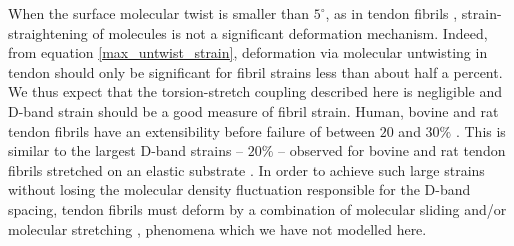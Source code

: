 When the surface molecular twist is smaller than $5^\circ$, as in tendon fibrils \cite{Hulmes:1981}, strain-straightening of molecules is not a significant deformation mechanism. Indeed, from equation \ref{max_untwist_strain}, deformation via molecular untwisting in tendon should only be significant for fibril strains less than about half a percent. We thus expect that the torsion-stretch coupling described here is negligible and D-band strain should be a good measure of fibril strain. Human, bovine and rat tendon fibrils have an extensibility before failure of between $20$ and $30\%$ \cite{Quigley:2018, Svensson:2013}. This is similar to the largest D-band strains  -- $20\%$ -- observed for bovine and rat tendon fibrils stretched on an elastic substrate \cite{Gachon:2020, Peacock:2019}. In order to achieve such large strains without losing the molecular density fluctuation responsible for the D-band spacing, tendon fibrils must deform by a combination of molecular sliding \cite{Gautieri:2017, Peacock:2019} and/or molecular stretching \cite{Iqbal:2019}, phenomena which we have not modelled here. 
